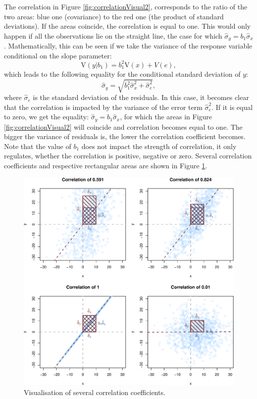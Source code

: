 \documentclass[
]{book}
\theoremstyle{definition}
\theoremstyle{definition}
\theoremstyle{definition}
\theoremstyle{definition}
\theoremstyle{remark}
\begin{document}
The correlation in Figure \ref{fig:correlationVisual2}, corresponds to the ratio of the two areas: blue one (covariance) to the red one (the product of standard deviations). If the areas coincide, the correlation is equal to one. This would only happen if all the observations lie on the straight line, the case for which \(\hat{\sigma}_y = b_1 \hat{\sigma}_x\). Mathematically, this can be seen if we take the variance of the response variable conditional on the slope parameter:
\begin{equation}
    \mathrm{V}(y | b_1) = b_1^2 \mathrm{V}(x) + V(e),
    \label{eq:varianceForCorrelation}
\end{equation}
which leads to the following equality for the conditional standard deviation of \(y\):
\begin{equation}
    \hat{\sigma}_y = \sqrt{b_1^2 \hat{\sigma}_x^2 + \hat{\sigma}_e^2} ,
    \label{eq:sdForCorrelation}
\end{equation}
where \(\hat{\sigma}_e\) is the standard deviation of the residuals. In this case, it becomes clear that the correlation is impacted by the variance of the error term \(\hat{\sigma}_e^2\). If it is equal to zero, we get the equality: \(\hat{\sigma}_y = b_1 \hat{\sigma}_x\), for which the areas in Figure \ref{fig:correlationVisual2} will coincide and correlation becomes equal to one. The bigger the variance of residuals is, the lower the correlation coefficient becomes. Note that the value of \(b_1\) does not impact the strength of correlation, it only regulates, whether the correlation is positive, negative or zero. Several correlation coefficients and respective rectangular areas are shown in Figure \ref{fig:correlationVisual3}.

\begin{figure}
\centering
\includegraphics{Svetunkov---Statistics-for-Business-Analytics_files/figure-latex/correlationVisual3-1.pdf}
\caption{\label{fig:correlationVisual3}Visualisation of several correlation coefficients.}
\end{figure}
\end{document}
